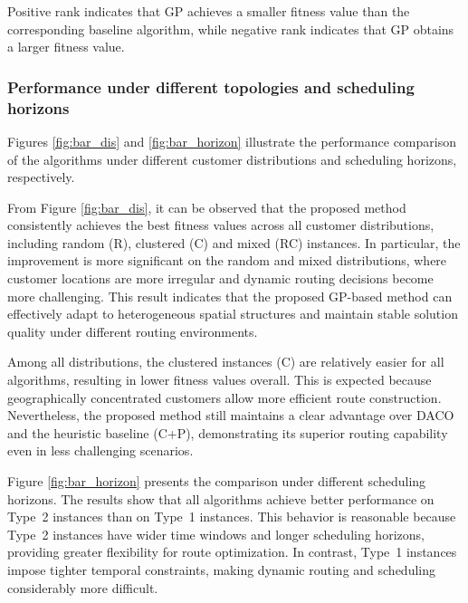 \documentclass[pdflatex]{sn-jnl}
\begin{document}
\begin{table}[ht]
\vspace{1mm}
\footnotesize{
\tiny{
Positive rank indicates that GP achieves a smaller fitness value than the corresponding baseline algorithm, while negative rank indicates that GP obtains a larger fitness value.}
}
\end{table}



\subsubsection{Performance under different topologies and scheduling horizons}
Figures \ref{fig:bar_dis} and \ref{fig:bar_horizon} illustrate the performance comparison of the algorithms under different customer distributions and scheduling horizons, respectively.

From Figure \ref{fig:bar_dis}, it can be observed that the proposed method consistently achieves the best fitness values across all customer distributions, including random (R), clustered (C) and mixed (RC) instances. In particular, the improvement is more significant on the random and mixed distributions, where customer locations are more irregular and dynamic routing decisions become more challenging. This result indicates that the proposed GP-based method can effectively adapt to heterogeneous spatial structures and maintain stable solution quality under different routing environments.

Among all distributions, the clustered instances (C) are relatively easier for all algorithms, resulting in lower fitness values overall. This is expected because geographically concentrated customers allow more efficient route construction. Nevertheless, the proposed method still maintains a clear advantage over DACO and the heuristic baseline (C+P), demonstrating its superior routing capability even in less challenging scenarios.

Figure \ref{fig:bar_horizon} presents the comparison under different scheduling horizons. The results show that all algorithms achieve better performance on Type~2 instances than on Type~1 instances. This behavior is reasonable because Type~2 instances have wider time windows and longer scheduling horizons, providing greater flexibility for route optimization. In contrast, Type~1 instances impose tighter temporal constraints, making dynamic routing and scheduling considerably more difficult.
\end{document}
